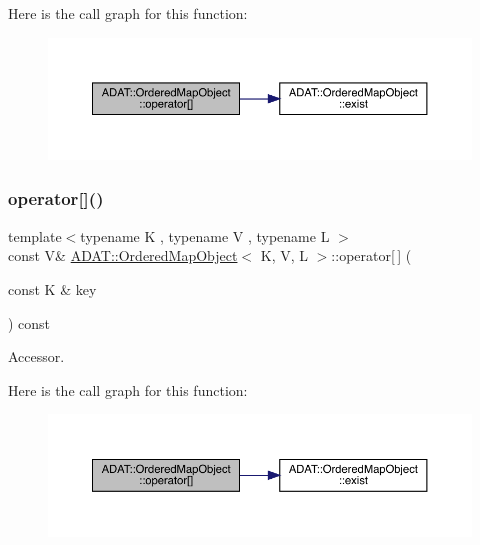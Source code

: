 Here is the call graph for this function\+:
\nopagebreak
\begin{figure}[H]
\begin{center}
\leavevmode
\includegraphics[width=350pt]{db/d8c/classADAT_1_1OrderedMapObject_ad6bf82315b8676a1e7a5733ad6d48e85_cgraph}
\end{center}
\end{figure}
\mbox{\label{classADAT_1_1OrderedMapObject_ad6bf82315b8676a1e7a5733ad6d48e85}} 
\subsubsection{\texorpdfstring{operator[]()}{operator[]()}\hspace{0.1cm}{\footnotesize\ttfamily [2/2]}}
{\footnotesize\ttfamily template$<$typename K , typename V , typename L $>$ \\
const V\& \mbox{\hyperlink{classADAT_1_1OrderedMapObject}{A\+D\+A\+T\+::\+Ordered\+Map\+Object}}$<$ K, V, L $>$\+::operator\mbox{[}$\,$\mbox{]} (\begin{DoxyParamCaption}\item[{const K \&}]{key }\end{DoxyParamCaption}) const\hspace{0.3cm}{\ttfamily [inline]}}



Accessor. 

Here is the call graph for this function\+:
\nopagebreak
\begin{figure}[H]
\begin{center}
\leavevmode
\includegraphics[width=350pt]{db/d8c/classADAT_1_1OrderedMapObject_ad6bf82315b8676a1e7a5733ad6d48e85_cgraph}
\end{center}
\end{figure}
\mbox{\label{classADAT_1_1OrderedMapObject_a3d96d76de0ad61fb858509543c3f60f4}} 
